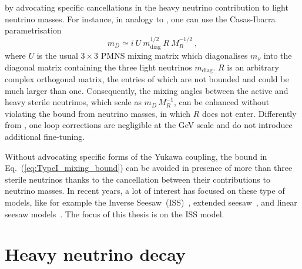 by advocating specific cancellations in the heavy neutrino contribution to light neutrino masses.
For instance, in analogy to , one can use the Casas-Ibarra parametrisation~\cite{Casas:2001sr}
\begin{equation}
	\label{eq:CasasIbarra}
	m_D \simeq i \ U \ m_\text{diag}^{1/2}\ R\ M_R^{-1/2}\ ,
\end{equation}
where $U$ is the usual $3\times 3$ PMNS mixing matrix %
which diagonalises $m_\nu$ into the diagonal matrix containing the three light neutrinos $m_\text{diag}$.
$R$ is an arbitrary complex orthogonal matrix, the entries of which are not bounded and could be much larger than one.
Consequently, the mixing angles between the active and heavy sterile neutrinos, %
which scale as $m_D\, M_{R}^{-1}$, can be enhanced without violating the bound from neutrino masses, %
in which $R$ does not enter.
Differently from , one loop corrections are negligible at the GeV scale and do not introduce additional fine-tuning. 

Without advocating specific forms of the Yukawa coupling, %
the bound in Eq.~(\ref{eq:TypeI_mixing_bound}) can be avoided in presence of more than three sterile neutrinos %
thanks to the cancellation between their contributions to neutrino masses.
In recent years, a lot of interest has focused on these type of models, like for example %
the Inverse Seesaw~(ISS)~\cite{Mohapatra:1986bd, GonzalezGarcia:1988rw}, extended seesaw~\cite{Barr:2003nn}, %
and linear seesaw models~\cite{Malinsky:2005bi,Kang:2006sn}.
The focus of this thesis is on the ISS model.
\fi





\section{Heavy neutrino decay}
\label{sec:decay}



